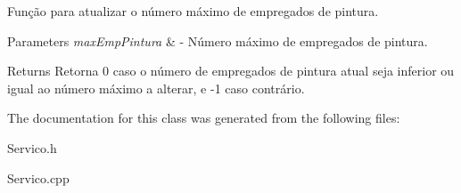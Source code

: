Função para atualizar o número máximo de empregados de pintura. 


\begin{DoxyParams}{Parameters}
{\em max\+Emp\+Pintura} & -\/ Número máximo de empregados de pintura. \\
\hline
\end{DoxyParams}
\begin{DoxyReturn}{Returns}
Retorna 0 caso o número de empregados de pintura atual seja inferior ou igual ao número máximo a alterar, e -\/1 caso contrário. 
\end{DoxyReturn}


The documentation for this class was generated from the following files\+:\begin{DoxyCompactItemize}
\item 
Servico.\+h\item 
Servico.\+cpp\end{DoxyCompactItemize}
